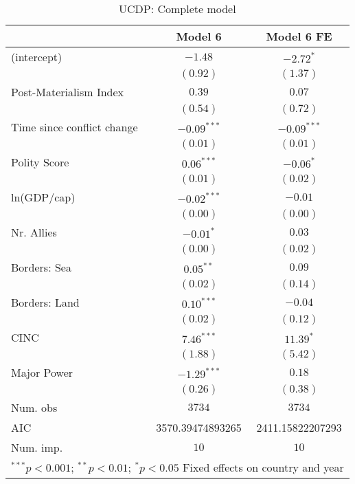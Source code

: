 
\begin{table}
\begin{center}
\begin{tabular}{l c c}
\toprule
 & Model 6 & Model 6 FE \\
\midrule
(intercept)                & $-1.48$          & $-2.72^{*}$      \\
                           & $(0.92)$         & $(1.37)$         \\
Post-Materialism Index     & $0.39$           & $0.07$           \\
                           & $(0.54)$         & $(0.72)$         \\
Time since conflict change & $-0.09^{***}$    & $-0.09^{***}$    \\
                           & $(0.01)$         & $(0.01)$         \\
Polity Score               & $0.06^{***}$     & $-0.06^{*}$      \\
                           & $(0.01)$         & $(0.02)$         \\
ln(GDP/cap)                & $-0.02^{***}$    & $-0.01$          \\
                           & $(0.00)$         & $(0.00)$         \\
Nr. Allies                 & $-0.01^{*}$      & $0.03$           \\
                           & $(0.00)$         & $(0.02)$         \\
Borders: Sea               & $0.05^{**}$      & $0.09$           \\
                           & $(0.02)$         & $(0.14)$         \\
Borders: Land              & $0.10^{***}$     & $-0.04$          \\
                           & $(0.02)$         & $(0.12)$         \\
CINC                       & $7.46^{***}$     & $11.39^{*}$      \\
                           & $(1.88)$         & $(5.42)$         \\
Major Power                & $-1.29^{***}$    & $0.18$           \\
                           & $(0.26)$         & $(0.38)$         \\
\midrule
Num. obs                   & $3734$           & $3734$           \\
AIC                        & 3570.39474893265 & 2411.15822207293 \\
Num. imp.                  & $10$             & $10$             \\
\bottomrule
\multicolumn{3}{l}{\scriptsize{$^{***}p<0.001$; $^{**}p<0.01$; $^{*}p<0.05$ 
 Fixed effects on country and year}}
\end{tabular}
\caption{UCDP: Complete model}
\label{UCDP_3_PM}
\end{center}
\end{table}
